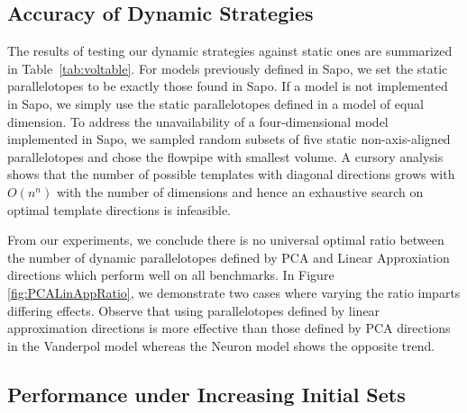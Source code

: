 \subsection{Accuracy of Dynamic Strategies}
\label{sec:dynamic_accuracy}
The results of testing our dynamic strategies against static ones are summarized in Table~\ref{tab:voltable}. For models previously defined in Sapo, we set the static parallelotopes to be exactly those found in Sapo.
If a model is not implemented in Sapo, we simply use the static parallelotopes defined in a model of equal dimension. To address the unavailability of a four-dimensional model implemented in Sapo, we sampled random subsets of five static non-axis-aligned parallelotopes and chose the flowpipe with smallest volume.
%
%
A cursory analysis shows that the number of possible templates with diagonal directions grows with $O(n^n)$ with the number of dimensions and hence an exhaustive search on optimal template directions is infeasible.


From our experiments, we conclude there is no universal optimal ratio between the number of dynamic parallelotopes defined by PCA and Linear Approxiation directions which perform well on all benchmarks. In Figure \ref{fig:PCALinAppRatio}, we demonstrate two cases where varying the ratio imparts differing effects. Observe that using parallelotopes defined by linear approximation directions is more effective than those defined by PCA directions in the Vanderpol model whereas the Neuron model shows the opposite trend.



%


\subsection{Performance under Increasing Initial Sets}
\label{sec:increasing_initial}

